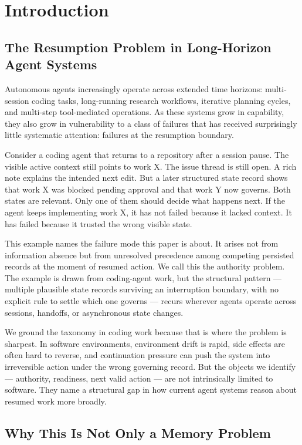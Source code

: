 \documentclass[preprint,12pt]{elsarticle}
\begin{document}
\section{Introduction}

\subsection{The Resumption Problem in Long-Horizon Agent Systems}

Autonomous agents increasingly operate across extended time horizons: multi-session coding tasks, long-running research workflows, iterative planning cycles, and multi-step tool-mediated operations. As these systems grow in capability, they also grow in vulnerability to a class of failures that has received surprisingly little systematic attention: failures at the resumption boundary.

Consider a coding agent that returns to a repository after a session pause. The visible active context still points to work X. The issue thread is still open. A rich note explains the intended next edit. But a later structured state record shows that work X was blocked pending approval and that work Y now governs. Both states are relevant. Only one of them should decide what happens next. If the agent keeps implementing work X, it has not failed because it lacked context. It has failed because it trusted the wrong visible state.

This example names the failure mode this paper is about. It arises not from information absence but from unresolved precedence among competing persisted records at the moment of resumed action. We call this the authority problem. The example is drawn from coding-agent work, but the structural pattern --- multiple plausible state records surviving an interruption boundary, with no explicit rule to settle which one governs --- recurs wherever agents operate across sessions, handoffs, or asynchronous state changes.

We ground the taxonomy in coding work because that is where the problem is sharpest. In software environments, environment drift is rapid, side effects are often hard to reverse, and continuation pressure can push the system into irreversible action under the wrong governing record. But the objects we identify --- authority, readiness, next valid action --- are not intrinsically limited to software. They name a structural gap in how current agent systems reason about resumed work more broadly.

\subsection{Why This Is Not Only a Memory Problem}
\end{document}
